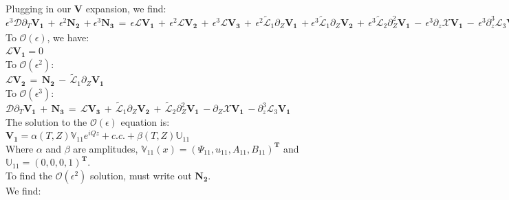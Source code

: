 \documentclass[letterpaper,12pt]{article}
\begin{document}
Plugging in our $\mathbf{V}$ expansion, we find: \\

$\epsilon^3 \mathcal{D} \partial_T \mathbf{V_1} \, + \, \epsilon^2\mathbf{N_2} \, + \epsilon^3 \mathbf{N_3} \, = \, \epsilon\mathcal{L}\mathbf{V_1} \, + \, \epsilon^2 \mathcal{L} \mathbf{V_2} \, + \, \epsilon^3 \mathcal{L}\mathbf{V_3} \, + \, \epsilon^2\widetilde{\mathcal{L}}_1 \partial_Z \mathbf{V_1} \, + \epsilon^3 \widetilde{\mathcal{L}}_1\partial_Z \mathbf{V_2} \, + \, \epsilon^3 \widetilde{\mathcal{L}}_2 \partial_Z^2 \mathbf{V_1} \, - \, \epsilon^3\partial_z \mathcal{X} \mathbf{V_1} \, - \, \epsilon^3\partial_z^3\mathcal{L}_3\mathbf{V_1} \, + \, \mathcal{O}(\epsilon^4)$ \\

To $\mathcal{O}(\epsilon)$, we have: \\

$\mathcal{L}\mathbf{V_1} = 0$ \\

To $\mathcal{O}(\epsilon^2)$: \\

$\mathcal{L}\mathbf{V_2} \, = \, \mathbf{N_2} \, - \, \widetilde{\mathcal{L}}_1 \partial_Z \mathbf{V_1}$ \\

To $\mathcal{O}(\epsilon^3)$: \\

$\mathcal{D}\partial_T \mathbf{V_1} \, + \, \mathbf{N_3} \, = \, \mathcal{L} \mathbf{V_3} \, + \, \widetilde{\mathcal{L}}_1\partial_Z\mathbf{V_2} \, + \, \widetilde{\mathcal{L}}_2\partial_Z^2\mathbf{V_1} \, - \partial_Z\mathcal{X}\mathbf{V_1} \, - \partial_z^3\mathcal{L}_3\mathbf{V_1}$ \\

The solution to the $\mathcal{O}(\epsilon)$ equation is: \\

$\mathbf{V_1} = \alpha(T, Z) \mathbb{V}_{11} e^{i Q z} + c.c. + \beta(T, Z)\mathbb{U}_{11}$ \\

Where $\alpha$ and $\beta$ are amplitudes, $\mathbb{V}_{11}(x) = (\Psi_{11}, u_{11}, A_{11}, B_{11})^\mathbf{T}$ and $\mathbb{U}_{11} = (0, 0, 0, 1)^\mathbf{T}$. \\

To find the $\mathcal{O}(\epsilon^2)$ solution, must write out $\mathbf{N_2}$. \\

We find: \\
\end{document}

